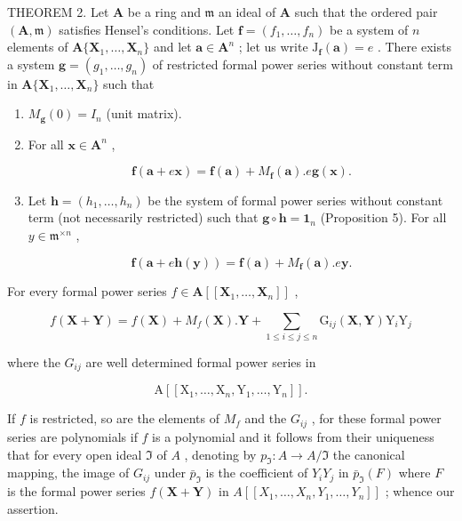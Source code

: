THEOREM 2. Let \(\mathbf{A}\) be a ring and \(\mathfrak{m}\) an ideal of \(\mathbf{A}\) such that the ordered pair \((\mathbf{A},\mathfrak{m})\) satisfies Hensel's conditions. Let \(\mathbf{f} = (f_1,\ldots ,f_n)\) be a system of \(n\) elements of \(\mathbf{A}\{\mathbf{X}_1,\ldots ,\mathbf{X}_n\}\) and let \(\mathbf{a}\in \mathbf{A}^n\) ; let us write \(\mathrm{J}_{\mathbf{f}}(\mathbf{a}) = e\) . There exists a system \(\mathbf{g} = (g_1,\dots ,g_n)\) of restricted formal power series without constant term in \(\mathbf{A}\{\mathbf{X}_1,\dots ,\mathbf{X}_n\}\) such that

\begin{enumerate}
\def\labelenumi{(\roman{enumi})}
\item
  \(M_{\mathbf{g}}(0) = I_{n}\) (unit matrix).
\item
  For all \(\mathbf{x} \in \mathbf{A}^n\) ,

\[
\mathbf {f} (\mathbf {a} + e \mathbf {x}) = \mathbf {f} (\mathbf {a}) + M _ {\mathbf {f}} (\mathbf {a}). e \mathbf {g} (\mathbf {x}).\tag{19}
\]

\item
  Let \(\mathbf{h} = (h_1, \ldots, h_n)\) be the system of formal power series without constant term (not necessarily restricted) such that \(\mathbf{g} \circ \mathbf{h} = \mathbf{1}_n\) (Proposition 5). For all \(y \in \mathfrak{m}^{\times n}\) ,

\[
\mathbf {f} (\mathbf {a} + e \mathbf {h} (\mathbf {y})) = \mathbf {f} (\mathbf {a}) + M _ {\mathbf {f}} (\mathbf {a}). e \mathbf {y}.\tag{20}
\]

\end{enumerate}

For every formal power series \(f \in \mathbf{A}[[\mathbf{X}_1, \ldots, \mathbf{X}_n]]\) ,

\[
f (\mathbf {X} + \mathbf {Y}) = f (\mathbf {X}) + M _ {f} (\mathbf {X}). \mathbf {Y} + \sum_ {1 \leqslant i \leqslant j \leqslant n} \mathrm{G} _ {i j} (\mathbf {X}, \mathbf {Y}) \mathrm{Y} _ {i} \mathrm{Y} _ {j}\tag{21}
\]

where the \(G_{ij}\) are well determined formal power series in

\[
\mathrm{A} \left[ \left[ \mathrm{X} _ {1}, \dots , \mathrm{X} _ {n}, \mathrm{Y} _ {1}, \dots , \mathrm{Y} _ {n} \right] \right].
\]

If \(f\) is restricted, so are the elements of \(M_{f}\) and the \(G_{ij}\) , for these formal power series are polynomials if \(f\) is a polynomial and it follows from their uniqueness that for every open ideal \(\Im\) of \(A\) , denoting by \(p_{\Im} \colon A \to A / \Im\) the canonical mapping, the image of \(G_{ij}\) under \(\bar{p}_{\Im}\) is the coefficient of \(Y_{i}Y_{j}\) in \(\bar{p}_{\Im}(F)\) where \(F\) is the formal power series \(f(\mathbf{X} + \mathbf{Y})\) in \(A[[X_1, \ldots, X_n, Y_1, \ldots, Y_n]]\) ; whence our assertion.

